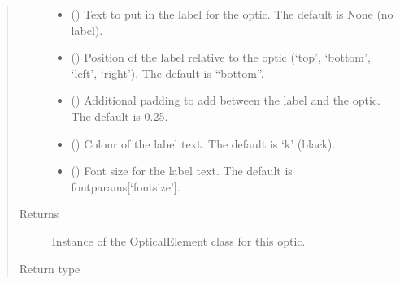 \documentclass[letterpaper,10pt,english]{sphinxmanual}
\begin{document}
\begin{fulllineitems}
\begin{fulllineitems}
\begin{quote}
\begin{description}
\begin{itemize}
\item {} 
\sphinxAtStartPar
{} (\sphinxstyleliteralemphasis{\sphinxupquote{, }}) \textendash{} Text to put in the label for the optic. The default is None (no label).

\item {} 
\sphinxAtStartPar
{} (\sphinxstyleliteralemphasis{\sphinxupquote{, }}) \textendash{} Position of the label relative to the optic (‘top’, ‘bottom’, ‘left’, ‘right’). The default is “bottom”.

\item {} 
\sphinxAtStartPar
{} (\sphinxstyleliteralemphasis{\sphinxupquote{, }}) \textendash{} Additional padding to add between the label and the optic. The default is 0.25.

\item {} 
\sphinxAtStartPar
{} (\sphinxstyleliteralemphasis{\sphinxupquote{, }}) \textendash{} Colour of the label text. The default is ‘k’ (black).

\item {} 
\sphinxAtStartPar
{} (\sphinxstyleliteralemphasis{\sphinxupquote{, }}) \textendash{} Font size for the label text. The default is fontparams{[}‘fontsize’{]}.

\end{itemize}

\item[{Returns}] \leavevmode
\sphinxAtStartPar
Instance of the OpticalElement class for this optic.

\item[{Return type}] \leavevmode
\sphinxAtStartPar
{\hyperref[\detokenize{index:pyopticaltable.OpticalElement}]{}}

\end{description}\end{quote}


\end{fulllineitems}
\end{fulllineitems}
\end{document}
